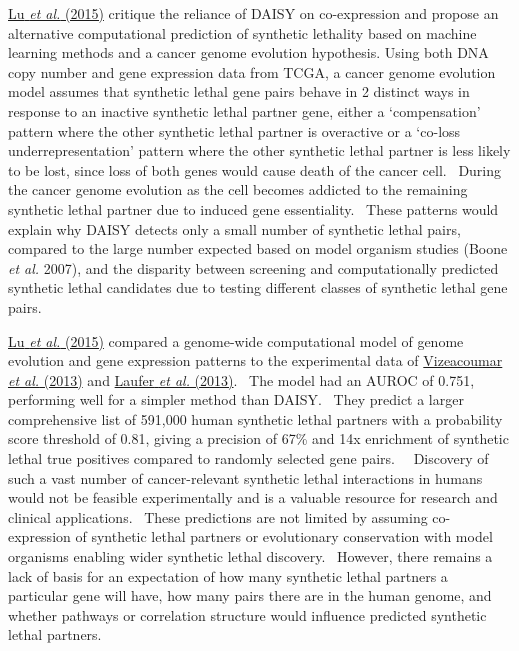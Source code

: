 \hyperlink{ENREF74}{Lu}\hyperlink{ENREF74}{\textit{ et al.}}\hyperlink{ENREF74}{ (2015)} critique the reliance of DAISY on co-expression and propose an alternative computational prediction of synthetic lethality based on machine learning methods and a cancer genome evolution hypothesis. Using both DNA copy number and gene expression data from TCGA, a cancer genome evolution model assumes that synthetic lethal gene pairs behave in 2 distinct ways in response to an inactive synthetic lethal partner gene, either a {\textquoteleft}compensation{\textquoteright} pattern where the other synthetic lethal partner is overactive or a {\textquoteleft}co-loss underrepresentation{\textquoteright} pattern where the other synthetic lethal partner is less likely to be lost, since loss of both genes would cause death of the cancer cell. \ During the cancer genome evolution as the cell becomes addicted to the remaining synthetic lethal partner due to induced gene essentiality. \ These patterns would explain why DAISY detects only a small number of synthetic lethal pairs, compared to the large number expected based on model organism studies (Boone\textit{ et al.} 2007), and the disparity between screening and computationally predicted synthetic lethal candidates due to testing different classes of synthetic lethal gene pairs. 

\hyperlink{ENREF74}{Lu}\hyperlink{ENREF74}{\textit{ et al.}}\hyperlink{ENREF74}{ (2015)} compared a genome-wide computational model of genome evolution and gene expression patterns to the experimental data of \hyperlink{ENREF108}{Vizeacoumar}\hyperlink{ENREF108}{\textit{ et al.}}\hyperlink{ENREF108}{ (2013)} and \hyperlink{ENREF60}{Laufer}\hyperlink{ENREF60}{\textit{ et al.}}\hyperlink{ENREF60}{ (2013)}. \ The model had an AUROC of 0.751, performing well for a simpler method than DAISY. \ They predict a larger comprehensive list of 591,000 human synthetic lethal partners with a probability score threshold of 0.81, giving a precision of 67\% and 14x enrichment of synthetic lethal true positives compared to randomly selected gene pairs. \ \ Discovery of such a vast number of cancer-relevant synthetic lethal interactions in humans would not be feasible experimentally and is a valuable resource for research and clinical applications. \ These predictions are not limited by assuming co-expression of synthetic lethal partners or evolutionary conservation with model organisms enabling wider synthetic lethal discovery. \ However, there remains a lack of basis for an expectation of how many synthetic lethal partners a particular gene will have, how many pairs there are in the human genome, and whether pathways or correlation structure would influence predicted synthetic lethal partners. 

